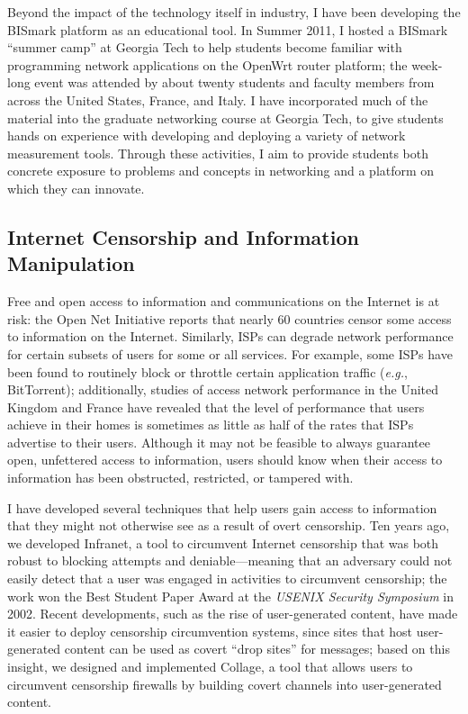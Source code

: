 \documentclass{article}
\newcommand{\eg}{{\em e.g.}}
\begin{document}
Beyond the impact of the technology itself in industry, I have been
developing the BISmark platform as an educational tool.  In Summer 2011,
I hosted a BISmark ``summer camp'' at Georgia Tech to help students
become familiar with programming network applications on the OpenWrt
router platform; the week-long event was attended by about twenty
students and faculty members from across the United States, France, and
Italy.  I have incorporated much of the material into the graduate
networking course at Georgia Tech, to give students hands on experience
with developing and deploying a variety of network measurement tools.
Through these activities, I aim to provide students both concrete
exposure to problems and concepts in networking and a platform on which
they can innovate.


\subsection*{Internet Censorship and Information Manipulation}

Free and open access to information and communications on the Internet
is at risk: the Open Net Initiative reports that nearly 60 countries
censor some access to information on the Internet.  Similarly, ISPs can
degrade network performance for certain subsets of users for some or all
services.  For example, some ISPs have been found to routinely block or
throttle certain application traffic (\eg, BitTorrent); additionally,
studies of access network performance in the United Kingdom and France
have revealed that the level of performance that users achieve in their
homes is sometimes as little as half of the rates that ISPs advertise to
their users.  Although it may not be feasible to always guarantee open,
unfettered access to information, users should know when their access to
information has been obstructed, restricted, or tampered with.

I have developed several techniques that help users gain access
to information that they might not otherwise see as a result of
overt censorship.  Ten years ago, we developed Infranet, a tool to
circumvent Internet censorship that was both robust to blocking attempts
and deniable---meaning that an adversary could not easily detect that a
user was engaged in activities to circumvent censorship; the work won
the Best Student Paper Award at the {\em USENIX Security Symposium} in
2002.  Recent developments, such as the rise of user-generated content,
have made it easier to deploy censorship circumvention systems, since
sites that host user-generated content can be used as covert ``drop
sites'' for messages; based on this insight, we designed and implemented
Collage, a tool that allows users to circumvent censorship firewalls by
building covert channels into user-generated content.  
\end{document}
